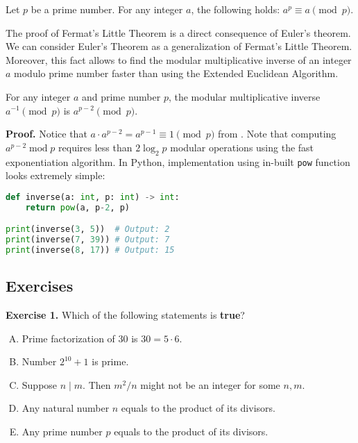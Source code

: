\documentclass[../lecture-notes-148x210.tex]{subfiles}
\begin{document}
\begin{theorem}  \label{th:fermat_little_theorem}
    Let $p$ be a prime number. For any integer $a$, the following holds: $a^{p} \equiv a \pmod{p}$.
\end{theorem}

The proof of Fermat's Little Theorem is a direct consequence of Euler's theorem.
We can consider Euler's Theorem as a generalization of Fermat's Little Theorem. Moreover,
this fact allows to find the modular multiplicative inverse of an integer $a$ modulo prime 
number faster than using the Extended Euclidean Algorithm.

\begin{corollary}
    For any integer $a$ and prime number $p$, the modular multiplicative inverse $a^{-1} \pmod{p}$ is $a^{p-2} \pmod{p}$.
\end{corollary}

\textbf{Proof.} Notice that $a \cdot a^{p-2} = a^{p-1} \equiv 1 \pmod{p}$ from . 
Note that computing $a^{p-2} \; \text{mod} \; p$ requires less than $2\log_2p$ modular operations using 
the fast exponentiation algorithm. In Python, implementation using in-built \texttt{pow} function 
looks extremely simple:
\begin{lstlisting}[language=Python]
def inverse(a: int, p: int) -> int:
    return pow(a, p-2, p)

print(inverse(3, 5))  # Output: 2
print(inverse(7, 39)) # Output: 7
print(inverse(8, 17)) # Output: 15
\end{lstlisting}

\subsection{Exercises}


\textbf{Exercise 1.} Which of the following statements is \textbf{true}?

\begin{enumerate}[(A)]
    \item Prime factorization of $30$ is $30=5 \cdot 6$.
    \item Number $2^{10}+1$ is prime.
    \item Suppose $n \mid m$. Then $m^2/n$ might not be an integer for some $n,m$.
    \item Any natural number $n$ equals to the product of its divisors.
    \item Any prime number $p$ equals to the product of its divisors.
\end{enumerate}
\end{document}
